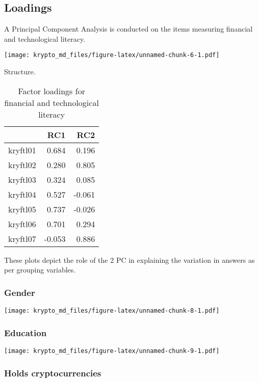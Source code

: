 \documentclass[doc]{apa7}
\begin{document}
\hypertarget{loadings}{%
\subsection{Loadings}\label{loadings}}

A Principal Component Analysis is conducted on the items measuring
financial and technological literacy.

\texttt{[image: krypto\_md\_files/figure-latex/unnamed-chunk-6-1.pdf]}

Structure.

\begin{table}

\caption{\label{tab:unnamed-chunk-7}Factor loadings for financial and technological literacy}
\centering
\begin{tabular}[t]{l|r|r}
\hline
  & RC1 & RC2\\
\hline
kryftl01 & 0.684 & 0.196\\
\hline
kryftl02 & 0.280 & 0.805\\
\hline
kryftl03 & 0.324 & 0.085\\
\hline
kryftl04 & 0.527 & -0.061\\
\hline
kryftl05 & 0.737 & -0.026\\
\hline
kryftl06 & 0.701 & 0.294\\
\hline
kryftl07 & -0.053 & 0.886\\
\hline
\end{tabular}
\end{table}

These plots depict the role of the 2 PC in explaining the variation in
answers as per grouping variables.

\hypertarget{gender}{%
\subsubsection{Gender}\label{gender}}

\texttt{[image: krypto\_md\_files/figure-latex/unnamed-chunk-8-1.pdf]}

\hypertarget{education}{%
\subsubsection{Education}\label{education}}

\texttt{[image: krypto\_md\_files/figure-latex/unnamed-chunk-9-1.pdf]}

\hypertarget{holds-cryptocurrencies}{%
\subsubsection{Holds cryptocurrencies}\label{holds-cryptocurrencies}}
\end{document}
